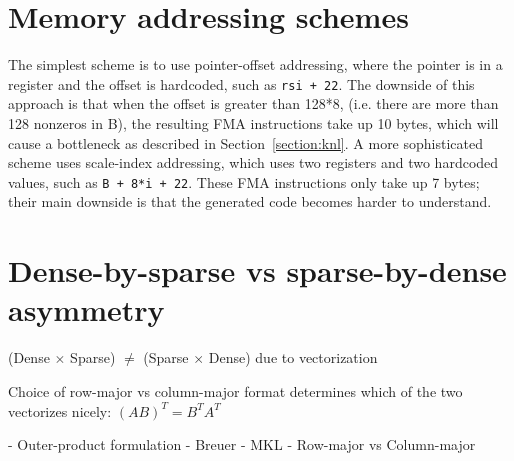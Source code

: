 \section{Memory addressing schemes}

The simplest scheme is to use pointer-offset addressing, where the pointer is in a register and the offset is hardcoded, such as \texttt{rsi + 22}. The downside of this approach is that when the offset is greater than 128*8, (i.e. there are more than 128 nonzeros in B), the resulting FMA instructions take up 10 bytes, which will cause a bottleneck as described in Section~\ref{section:knl}. A more sophisticated scheme uses scale-index addressing, which uses two registers and two hardcoded values, such as \texttt{B + 8*i + 22}. These FMA instructions only take up 7 bytes; their main downside is that the generated code becomes harder to understand.




\section{Dense-by-sparse vs sparse-by-dense asymmetry}
\label{section:asymmetry}
(Dense $\times$ Sparse) $\neq$ (Sparse $\times$ Dense) due to vectorization

Choice of row-major vs column-major format determines which of the two vectorizes nicely: $(AB)^T = B^T A^T$

- Outer-product formulation
- Breuer
- MKL
- Row-major vs Column-major


